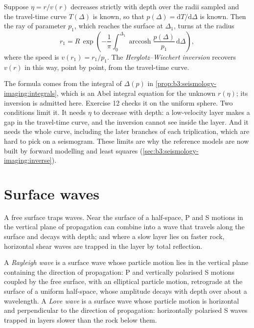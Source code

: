 \begin{proposition}\label{prop:b3:seismology-imaging:herglotz}
Suppose $\eta = r/v(r)$ decreases strictly with depth over the radii sampled
and the travel-time curve $T(\Delta)$ is known, so that $p(\Delta) =
\mathrm dT/\mathrm d\Delta$ is known. Then the ray of parameter $p_1$, which
reaches the surface at $\Delta_1$, turns at the radius
\[
  r_1 = R\,\exp\!\left(-\frac1\pi\int_0^{\Delta_1}
  \operatorname{arccosh}\frac{p(\Delta)}{p_1}\,\mathrm d\Delta\right),
\]
where the speed is $v(r_1) = r_1/p_1$. The \emph{Herglotz--Wiechert
inversion} recovers $v(r)$ in this way,
point by point, from the travel-time curve.
\end{proposition}
\admitted

The formula comes from the integral of $\Delta(p)$ in
\cref{prop:b3:seismology-imaging:integrals}, which is an Abel integral
equation for the unknown $r(\eta)$; its inversion is admitted here.
Exercise 12 checks it on the uniform sphere. Two conditions limit it. It needs
$\eta$ to decrease with depth: a low-velocity layer makes a gap in the
travel-time curve, and the inversion cannot see inside the layer. And it needs
the whole curve, including the later branches of each triplication, which are
hard to pick on a seismogram. These limits are why the reference models are now
built by forward modelling and least squares (\cref{sec:b3:seismology-imaging:inverse}).

\section{Surface waves}

A free surface traps waves. Near the surface of a half-space, P and S motions
in the vertical plane of propagation can combine into a wave that travels along
the surface and decays with depth; and where a slow layer lies on faster rock,
horizontal shear waves are trapped in the layer by total reflection.

\begin{definition}\label{def:b3:seismology-imaging:surface-waves}
A \emph{Rayleigh wave} is a surface wave whose particle
motion lies in the vertical plane containing the direction of propagation:
P and vertically polarised S motions coupled by the free surface, with an
elliptical particle motion, retrograde at the surface of a uniform half-space,
whose amplitude decays with depth over about a wavelength. A \emph{Love
wave} is a surface wave whose particle motion is horizontal
and perpendicular to the direction of propagation: horizontally polarised S
waves trapped in layers slower than the rock below them.
\end{definition}

